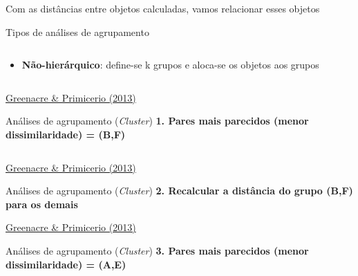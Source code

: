 \documentclass[
  ignorenonframetext,
]{beamer}
\begin{document}
\begin{frame}{Com as distâncias entre objetos calculadas, vamos
relacionar esses objetos}
\begin{block}{Tipos de análises de agrupamento}
\begin{columns}[T]
\begin{column}{0.5\textwidth}
\begin{itemize}
\item
  \textbf{Não-hierárquico}: define-se k grupos e aloca-se os objetos aos
  grupos
\end{itemize}
\end{column}
\end{columns}

\href{https://www.fbbva.es/microsite/multivariate-statistics/}{Greenacre
\& Primicerio (2013)}
\end{block}

\begin{block}{Análises de agrupamento (\emph{Cluster})}
\protect\hypertarget{anuxe1lises-de-agrupamento-cluster}{}
\textbf{1. Pares mais parecidos (menor dissimilaridade) = (B,F)}

\begin{columns}[T]
\begin{column}{0.65\textwidth}
\end{column}

\begin{column}{0.35\textwidth}
\end{column}
\end{columns}

\href{https://www.fbbva.es/microsite/multivariate-statistics/}{Greenacre
\& Primicerio (2013)}
\end{block}

\begin{block}{Análises de agrupamento (\emph{Cluster})}
\protect\hypertarget{anuxe1lises-de-agrupamento-cluster-1}{}
\textbf{2. Recalcular a distância do grupo (B,F) para os demais}

\href{https://www.fbbva.es/microsite/multivariate-statistics/}{Greenacre
\& Primicerio (2013)}
\end{block}

\begin{block}{Análises de agrupamento (\emph{Cluster})}
\protect\hypertarget{anuxe1lises-de-agrupamento-cluster-2}{}
\textbf{3. Pares mais parecidos (menor dissimilaridade) = (A,E)}

\begin{columns}[T]
\begin{column}{0.65\textwidth}
\end{column}

\begin{column}{0.35\textwidth}
\end{column}
\end{columns}


\end{block}
\end{frame}
\end{document}
